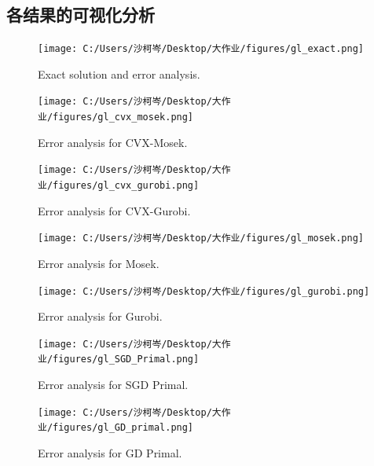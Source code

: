 \documentclass[10pt,a4paper]{article}
\begin{document}
 \subsection{各结果的可视化分析}
 \begin{figure}[htbp]
 	\centering
 	\texttt{[image: C:/Users/沙柯岑/Desktop/大作业/figures/gl\_exact.png]} %
 	\caption{Exact solution and error analysis.}
 	\label{fig:error_analysis_exact}
 \end{figure}
 
 \begin{figure}[htbp]
 	\centering
 	\texttt{[image: C:/Users/沙柯岑/Desktop/大作业/figures/gl\_cvx\_mosek.png]}
 	\caption{Error analysis for CVX-Mosek.}
 	\label{fig:error_analysis_cvx_mosek}
 \end{figure}
 
 \begin{figure}[htbp]
 	\centering
 	\texttt{[image: C:/Users/沙柯岑/Desktop/大作业/figures/gl\_cvx\_gurobi.png]}
 	\caption{Error analysis for CVX-Gurobi.}
 	\label{fig:error_analysis_cvx_gurobi}
 \end{figure}
 
 \begin{figure}[htbp]
 	\centering
 	\texttt{[image: C:/Users/沙柯岑/Desktop/大作业/figures/gl\_mosek.png]}
 	\caption{Error analysis for Mosek.}
 	\label{fig:error_analysis_mosek}
 \end{figure}
 
 \begin{figure}[htbp]
 	\centering
 	\texttt{[image: C:/Users/沙柯岑/Desktop/大作业/figures/gl\_gurobi.png]}
 	\caption{Error analysis for Gurobi.}
 	\label{fig:error_analysis_gurobi}
 \end{figure}
 
 \begin{figure}[htbp]
 	\centering
 	\texttt{[image: C:/Users/沙柯岑/Desktop/大作业/figures/gl\_SGD\_Primal.png]}
 	\caption{Error analysis for SGD Primal.}
 	\label{fig:error_analysis_sgd_primal}
 \end{figure}
 
 \begin{figure}[htbp]
 	\centering
 	\texttt{[image: C:/Users/沙柯岑/Desktop/大作业/figures/gl\_GD\_primal.png]}
 	\caption{Error analysis for GD Primal.}
 	\label{fig:error_analysis_gd_primal}
 \end{figure}
 
\end{document}
